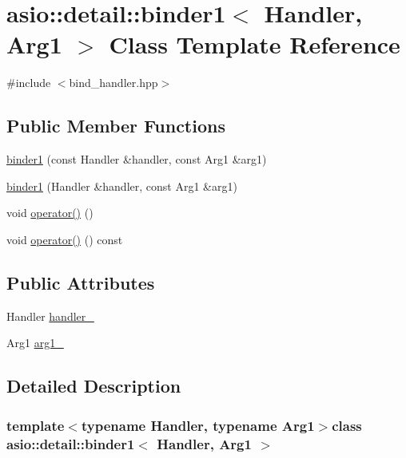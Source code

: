 \hypertarget{classasio_1_1detail_1_1binder1}{}\section{asio\+:\+:detail\+:\+:binder1$<$ Handler, Arg1 $>$ Class Template Reference}
\label{classasio_1_1detail_1_1binder1}


{\ttfamily \#include $<$bind\+\_\+handler.\+hpp$>$}

\subsection*{Public Member Functions}
\begin{DoxyCompactItemize}
\item 
\hyperlink{classasio_1_1detail_1_1binder1_ac8be09cb7da0bde108201256806825f7}{binder1} (const Handler \&handler, const Arg1 \&arg1)
\item 
\hyperlink{classasio_1_1detail_1_1binder1_ab9d5f61e5c61bac34455a76ff73d82b4}{binder1} (Handler \&handler, const Arg1 \&arg1)
\item 
void \hyperlink{classasio_1_1detail_1_1binder1_a908f2393b4fb0f12a88f19a03e965ae9}{operator()} ()
\item 
void \hyperlink{classasio_1_1detail_1_1binder1_adb046907b08e1d325cabbafb86e3eb1e}{operator()} () const 
\end{DoxyCompactItemize}
\subsection*{Public Attributes}
\begin{DoxyCompactItemize}
\item 
Handler \hyperlink{classasio_1_1detail_1_1binder1_a83f2550a63cac4baba9bdc47eef89b0d}{handler\+\_\+}
\item 
Arg1 \hyperlink{classasio_1_1detail_1_1binder1_a1097fe55b45d93ab5b1b2e209a153241}{arg1\+\_\+}
\end{DoxyCompactItemize}


\subsection{Detailed Description}
\subsubsection*{template$<$typename Handler, typename Arg1$>$class asio\+::detail\+::binder1$<$ Handler, Arg1 $>$}




